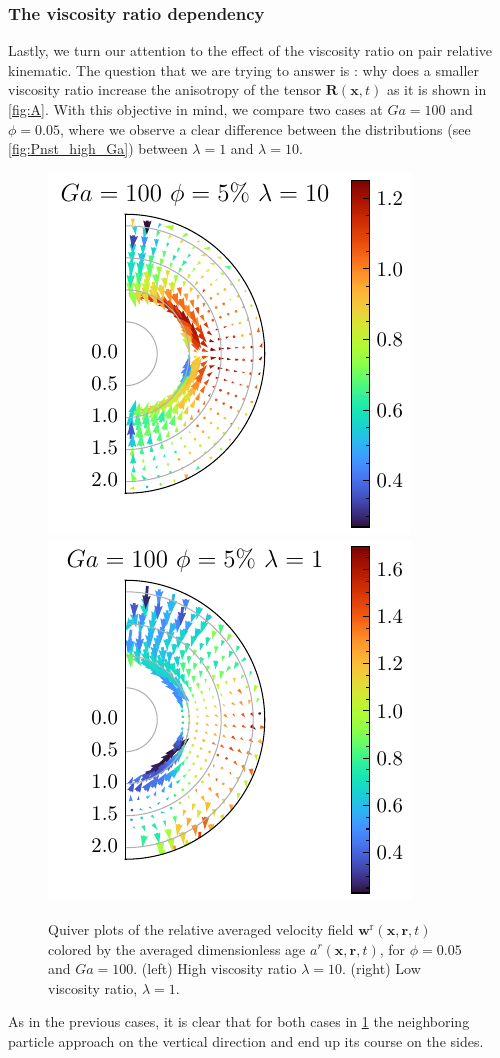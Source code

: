 \subsubsection*{The viscosity ratio dependency}

Lastly, we turn our attention to the effect of the viscosity ratio on pair relative kinematic.
The question that we are trying to answer is : why does a smaller viscosity ratio increase the anisotropy of the tensor $\textbf{R}(\textbf{x},t)$ as it is shown in \ref{fig:A}. 
With this objective in mind, we compare two cases at $Ga = 100$ and $\phi =0.05$, where we observe a clear difference between the distributions (see \ref{fig:Pnst_high_Ga}) between $\lambda = 1$ and $\lambda = 10$.
\begin{figure}[h!]
    \centering
    \includegraphics[height=0.35\textwidth]{image/HOMOGENEOUS_NEW/Dist/U_rel_l_10_Ga_100_PHI_5.pdf}
    \includegraphics[height=0.35\textwidth]{image/HOMOGENEOUS_NEW/Dist/U_rel_l_1_Ga_100_PHI_5.pdf}
    \caption{Quiver plots of the relative averaged velocity field $\textbf{w}^\text{r}(\textbf{x},\textbf{r},t)$ colored by the averaged dimensionless age $a^r(\textbf{x},\textbf{r},t)$, for $\phi = 0.05$ and $Ga = 100$. 
    (left) High viscosity ratio $\lambda = 10$.
    (right) Low viscosity ratio, $\lambda = 1$. }
    \label{fig:Why_l_matter}
\end{figure}
As in the previous cases, it is clear that for both cases in \ref{fig:Why_l_matter} the neighboring particle approach on the vertical direction and end up its course on the sides.
